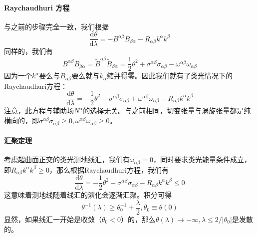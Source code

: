 \documentclass[hyperref, UTF8, a4paper]{ctexart}
\begin{document}
\paragraph{Raychaudhuri 方程}

与之前的步骤完全一致，我们根据
\begin{equation*}
	\frac{\mathrm{d} \theta }{\mathrm{d} \lambda } =-B^{\alpha \beta } B_{\beta \alpha } -R_{\alpha \beta } k^{\alpha } k^{\beta }
\end{equation*}
同样的，我们有
\begin{equation*}
	B^{\alpha \beta } B_{\beta \alpha } =\tilde{B}^{\alpha \beta }\tilde{B}_{\beta \alpha } =\frac{1}{2} \theta ^{2} +\sigma ^{\alpha \beta } \sigma _{\alpha \beta } -\omega ^{\alpha \beta } \omega _{\alpha \beta }
\end{equation*}
因为一个$k^{\alpha }$要么与$B_{\alpha \beta }$要么就与$k_{\alpha }$缩并得零。因此我们就有了类光情况下的Raychaudhuri方程：
\begin{equation*}
	\frac{\mathrm{d} \theta }{\mathrm{d} \lambda } =-\frac{1}{2} \theta ^{2} -\sigma ^{\alpha \beta } \sigma _{\alpha \beta } +\omega ^{\alpha \beta } \omega _{\alpha \beta } -R_{\alpha \beta } k^{\alpha } k^{\beta }
\end{equation*}
注意，此方程与辅助场$N^{\alpha }$的选择无关。与之前相同，切变张量与涡旋张量都是纯横向的，即$\sigma ^{\alpha \beta } \sigma _{\alpha \beta } \geq 0,\omega ^{\alpha \beta } \omega _{\alpha \beta } \geq 0$。


\paragraph{汇聚定理}

考虑超曲面正交的类光测地线汇，我们有$\omega _{\alpha \beta } =0$，同时要求类光能量条件成立，即$R_{\alpha \beta } k^{\alpha } k^{\beta } \geq 0$，那么根据Raychaudhuri方程，我们有
\begin{equation*}
	\frac{\mathrm{d} \theta }{\mathrm{d} \lambda } =-\frac{1}{2} \theta ^{2} -\sigma ^{\alpha \beta } \sigma _{\alpha \beta } -R_{\alpha \beta } k^{\alpha } k^{\beta } \leq 0
\end{equation*}
这意味着测地线随着线汇的演化会逐渐汇聚。积分可得
\begin{equation*}
	\theta ^{-1}( \lambda ) \geq \theta _{0}^{-1} +\frac{\lambda }{2} ,\theta _{0} \equiv \theta ( 0)
\end{equation*}
显然，如果线汇一开始是收敛（$\theta _{0} < 0$）的，那么$\theta ( \lambda )\rightarrow -\infty ,\lambda \leq 2/| \theta _{0}| $是发散的。
\end{document}
